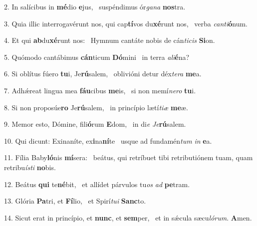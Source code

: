 2. In salícibus in \textbf{mé}dio \textbf{e}jus, \ast\  suspéndimus ór\textit{ga}\textit{na} \textbf{nos}tra.\

3. Quia illic interrogavérunt nos, qui cap\textbf{tí}vos du\textbf{xé}runt nos, \ast\  verba \textit{can}\textit{ti}\textbf{ó}num.\

4. Et qui \textbf{ab}du\textbf{xé}runt nos: \ast\  Hymnum cantáte nobis de cán\textit{ti}\textit{cis} \textbf{Si}on.\

5. Quómodo cantábimus \textbf{cán}ticum \textbf{Dó}mini \ast\  in terra \textit{a}\textit{li}\textbf{é}na?\

6. Si oblítus fúero \textbf{tu}i, Je\textbf{rú}salem, \ast\  oblivióni detur déx\textit{te}\textit{ra} \textbf{me}a.\

7. Adhǽreat lingua mea \textbf{fáu}cibus \textbf{me}is, \ast\  si non memí\textit{ne}\textit{ro} \textbf{tu}i.\

8. Si non proposúe\textbf{ro} Je\textbf{rú}salem, \ast\  in princípio lætí\textit{ti}\textit{æ} \textbf{me}æ.\

9. Memor esto, Dómine, fili\textbf{ó}rum \textbf{E}dom, \ast\  in di\textit{e} \textit{Je}\textbf{rú}salem.\

10. Qui dicunt: Exinaníte, ex\textbf{i}na\textbf{ní}te \ast\  usque ad fundamén\textit{tum} \textit{in} \textbf{e}a.\

11. Fília Baby\textbf{ló}nis \textbf{mí}sera: \ast\  beátus, qui retríbuet tibi retributiónem tuam, quam retribu\textit{ís}\textit{ti} \textbf{no}bis.\

12. Beátus \textbf{qui} te\textbf{né}bit, \ast\  et allídet párvulos tu\textit{os} \textit{ad} \textbf{pe}tram.\

13. Glória \textbf{Pa}tri, et \textbf{Fí}lio, \ast\  et Spirí\textit{tu}\textit{i} \textbf{Sanc}to.\

14. Sicut erat in princípio, et \textbf{nunc}, et \textbf{sem}per, \ast\  et in sǽcula sæcu\textit{ló}\textit{rum}. \textbf{A}men.\

